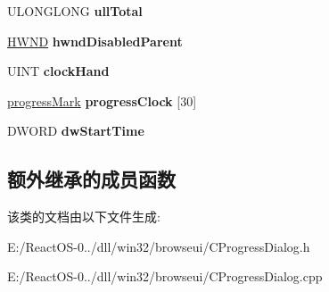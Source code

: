 \begin{DoxyCompactItemize}
U\+L\+O\+N\+G\+L\+O\+NG {\bfseries ull\+Total}
\item 
\mbox{\label{class_c_progress_dialog_a42a9059898b8c44a1533f47cc7695530}} 
\hyperlink{interfacevoid}{H\+W\+ND} {\bfseries hwnd\+Disabled\+Parent}
\item 
\mbox{\label{class_c_progress_dialog_a4073e052db2a9d977d3ac9cf2c4757ba}} 
U\+I\+NT {\bfseries clock\+Hand}
\item 
\mbox{\label{class_c_progress_dialog_aef020e2d0c48a062ad09fafa31ba59f4}} 
\hyperlink{struct_c_progress_dialog_1_1progress_mark}{progress\+Mark} {\bfseries progress\+Clock} \mbox{[}30\mbox{]}
\item 
\mbox{\label{class_c_progress_dialog_a13af590d25f053f729a1faea44df151e}} 
D\+W\+O\+RD {\bfseries dw\+Start\+Time}
\end{DoxyCompactItemize}
\subsection*{额外继承的成员函数}


该类的文档由以下文件生成\+:\begin{DoxyCompactItemize}
\item 
E\+:/\+React\+O\+S-\/0../dll/win32/browseui/C\+Progress\+Dialog.\+h\item 
E\+:/\+React\+O\+S-\/0../dll/win32/browseui/C\+Progress\+Dialog.\+cpp\end{DoxyCompactItemize}
